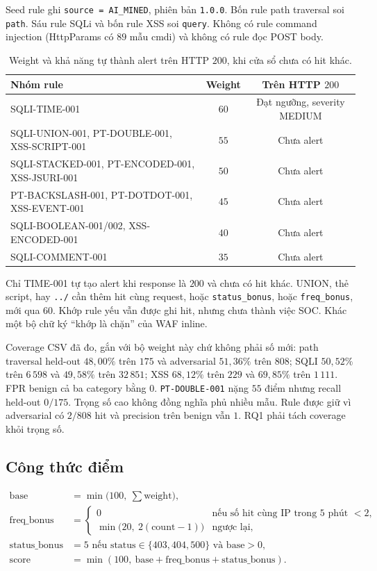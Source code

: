 \documentclass[a4paper,11pt]{article}
\begin{document}
Seed rule ghi \texttt{source = AI\_MINED}, phiên bản \texttt{1.0.0}. Bốn rule path traversal soi \texttt{path}. Sáu rule SQLi và bốn rule XSS soi \texttt{query}. Không có rule command injection (HttpParams có $89$ mẫu cmdi) và không có rule đọc POST body.

\begin{table}[ht]
\centering
\caption{Weight và khả năng tự thành alert trên HTTP $200$, khi cửa sổ chưa có hit khác.}
\label{tab:weights}
\small
\begin{tabular}{@{}lcc@{}}
\toprule
Nhóm rule & Weight & Trên HTTP $200$ \\
\midrule
SQLI-TIME-001 & $60$ & Đạt ngưỡng, severity MEDIUM \\
SQLI-UNION-001, PT-DOUBLE-001, XSS-SCRIPT-001 & $55$ & Chưa alert \\
SQLI-STACKED-001, PT-ENCODED-001, XSS-JSURI-001 & $50$ & Chưa alert \\
PT-BACKSLASH-001, PT-DOTDOT-001, XSS-EVENT-001 & $45$ & Chưa alert \\
SQLI-BOOLEAN-001/002, XSS-ENCODED-001 & $40$ & Chưa alert \\
SQLI-COMMENT-001 & $35$ & Chưa alert \\
\bottomrule
\end{tabular}
\end{table}

Chỉ TIME-001 tự tạo alert khi response là $200$ và chưa có hit khác. UNION, thẻ script, hay \texttt{../} cần thêm hit cùng request, hoặc \texttt{status\_bonus}, hoặc \texttt{freq\_bonus}, mới qua $60$. Khớp rule yếu vẫn được ghi hit, nhưng chưa thành việc SOC. Khác một bộ chữ ký ``khớp là chặn'' của WAF inline.

Coverage CSV đã đo, gắn với bộ weight này chứ không phải số mới: path traversal held-out $48{,}00\%$ trên $175$ và adversarial $51{,}36\%$ trên $808$; SQLI $50{,}52\%$ trên $6\,598$ và $49{,}58\%$ trên $32\,851$; XSS $68{,}12\%$ trên $229$ và $69{,}85\%$ trên $1\,111$. FPR benign cả ba category bằng $0$. \texttt{PT-DOUBLE-001} nặng $55$ điểm nhưng recall held-out $0/175$. Trọng số cao không đồng nghĩa phủ nhiều mẫu. Rule được giữ vì adversarial có $2/808$ hit và precision trên benign vẫn $1$. RQ1 phải tách coverage khỏi trọng số.

\subsection{Công thức điểm}

\begin{align*}
\mathrm{base} &= \min\bigl(100,\ \textstyle\sum \mathrm{weight}\bigr),\\
\mathrm{freq\_bonus} &=
\begin{cases}
0 & \text{nếu số hit cùng IP trong $5$ phút $< 2$},\\
\min\bigl(20,\ 2(\mathrm{count}-1)\bigr) & \text{ngược lại},
\end{cases}\\
\mathrm{status\_bonus} &= 5 \text{ nếu status}\in\{403,404,500\} \text{ và base}>0,\\
\mathrm{score} &= \min(100,\ \mathrm{base}+\mathrm{freq\_bonus}+\mathrm{status\_bonus}).
\end{align*}
\end{document}
